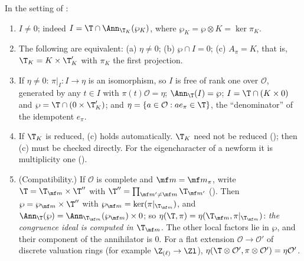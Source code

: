 \begin{proposition}\label{prop:modules:congruence-ideal}
In the setting of :
\begin{enumerate}[label=(\roman*)]
\item $I\ne0$; indeed $I=\T\cap\Ann_{\T_K}(\wp_K)$, where $\wp_K=\wp\otimes K=\ker\pi_K$.
\item The following are equivalent: (a) $\eta\ne0$; (b) $\wp\cap I=0$; (c) $A_\pi=K$, that is, $\T_K=K\times\T'_K$ with $\pi_K$ the first projection.
\item If $\eta\ne0$: $\pi|_I\colon I\to\eta$ is an isomorphism, so $I$ is free of rank one over $\mathcal O$, generated by any $t\in I$ with $\pi(t)\mathcal O=\eta$; $\Ann_\T(I)=\wp$;
$I=\T\cap(K\times0)$ and $\wp=\T\cap(0\times\T'_K)$; and $\eta=\{a\in\mathcal O:ae_\pi\in\T\}$, the ``denominator'' of the idempotent $e_\pi$.
\item If $\T_K$ is reduced, (c) holds automatically. $\T_K$ need not be reduced (); then (c) must be checked directly. For the
eigencharacter of a newform it is multiplicity one ().
\item (Compatibility.) If $\mathcal O$ is complete and $\mf m=\mf m_\pi$, write $\T=\T_{\mf m}\times\T''$ with $\T''=\prod_{\mf m'\ne\mf m}\T_{\mf m'}$ (). Then
$\wp=\wp_{\mf m}\times\T''$ with $\wp_{\mf m}=\ker(\pi|_{\T_{\mf m}})$, and $\Ann_\T(\wp)=\Ann_{\T_{\mf m}}(\wp_{\mf m})\times0$; so $\eta(\T,\pi)=\eta(\T_{\mf m},\pi|_{\T_{\mf m}})$: \emph{the congruence ideal is
computed in $\T_{\mf m}$}. The other local factors lie in $\wp$, and their component of the annihilator is $0$. For a flat extension $\mathcal O\to\mathcal O'$ of discrete valuation
rings (for example $\Z_{(\ell)}\to\Zl$), $\eta(\T\otimes\mathcal O',\pi\otimes\mathcal O')=\eta\mathcal O'$.
\end{enumerate}
\end{proposition}

